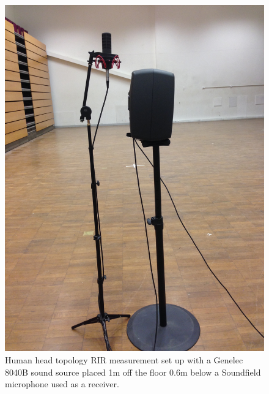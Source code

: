 \documentclass[../../main.tex]{subfiles}
\begin{document}
		\begin{figure}[H]
			\begin{center}
				\includegraphics[scale = 0.06]{Sections/Implementation/RealRIRs/images/realRIRTopology1.jpg} 
				\caption{Human head topology \ac{RIR} measurement set up with a Genelec 8040B sound source placed 1m off the floor 0.6m below a Soundfield microphone used as a receiver.}
				\label{realRIRTop}
			\end{center}
		\end{figure}
\end{document}
